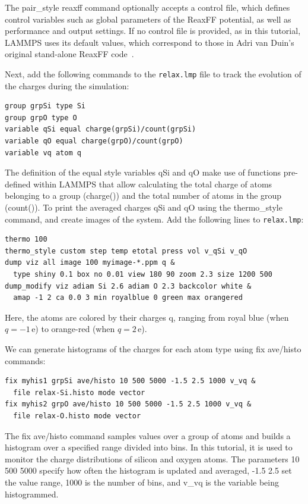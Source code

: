 \documentclass[9pt,tutorial]{livecoms}
\newcommand{\lmpcmd}[1]{\colorbox{listing}{\textcolor{command}{\small{#1}}}} %
\newcommand{\flecmd}[1]{\textcolor{command}{\texttt{#1}}} %
\begin{document}
\begin{note}
  The \lmpcmd{pair\_style reaxff} command optionally accepts a control file,
  which defines control variables such as
  global parameters of the ReaxFF potential, as well as performance and output settings.
  If no control file is provided, as in this tutorial, LAMMPS uses its default values,
  which correspond to those in Adri van Duin's original stand-alone ReaxFF code~\cite{van2001reaxff}.
\end{note}
Next, add the following commands to the \flecmd{relax.lmp} file to track the
evolution of the charges during the simulation:
\begin{lstlisting}
group grpSi type Si
group grpO type O
variable qSi equal charge(grpSi)/count(grpSi)
variable qO equal charge(grpO)/count(grpO)
variable vq atom q
\end{lstlisting}
The definition of the equal style variables qSi and qO
make use of functions pre-defined within LAMMPS that allow calculating
the total charge of atoms belonging to a group (charge()) and the total
number of atoms in the group (count()).
To print the averaged charges \lmpcmd{qSi} and \lmpcmd{qO} using the
\lmpcmd{thermo\_style} command, and create images of the system.  Add the
following lines to \flecmd{relax.lmp}:
\begin{lstlisting}
thermo 100
thermo_style custom step temp etotal press vol v_qSi v_qO
dump viz all image 100 myimage-*.ppm q &
  type shiny 0.1 box no 0.01 view 180 90 zoom 2.3 size 1200 500
dump_modify viz adiam Si 2.6 adiam O 2.3 backcolor white &
  amap -1 2 ca 0.0 3 min royalblue 0 green max orangered
\end{lstlisting}
Here, the atoms are colored by their charges \lmpcmd{q}, ranging from royal blue
(when $q=-1\,\text{e}$) to orange-red (when $q=2\,\text{e}$).

We can generate histograms of the charges for each atom type using
\lmpcmd{fix ave/histo} commands:
\begin{lstlisting}
fix myhis1 grpSi ave/histo 10 500 5000 -1.5 2.5 1000 v_vq &
  file relax-Si.histo mode vector
fix myhis2 grpO ave/histo 10 500 5000 -1.5 2.5 1000 v_vq &
  file relax-O.histo mode vector
\end{lstlisting}
The \lmpcmd{fix ave/histo} command samples values
over a group of atoms and builds a histogram over a specified range divided into
bins.  In this tutorial, it is used to monitor the charge distributions
of silicon and oxygen atoms.  The parameters \lmpcmd{10 500 5000} specify how often
the histogram is updated and averaged, \lmpcmd{-1.5 2.5} set the value range,
\lmpcmd{1000} is the number of bins, and \lmpcmd{v\_vq} is the variable being histogrammed.
\end{document}
